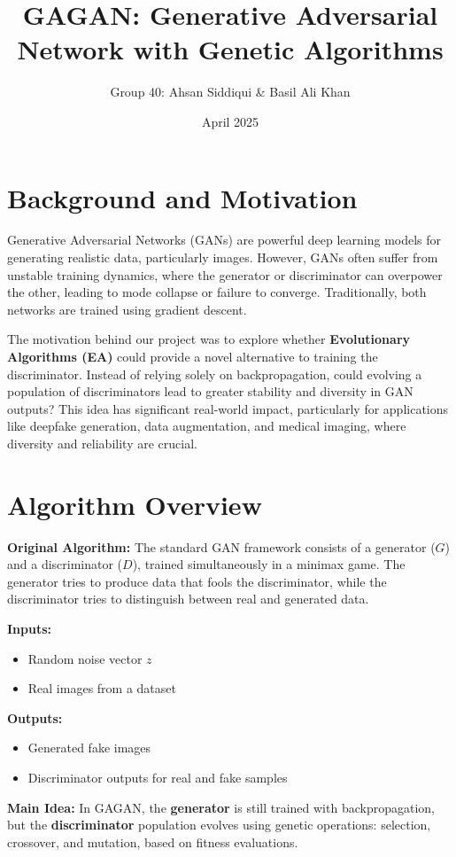\documentclass[12pt]{article}
\title{GAGAN: Generative Adversarial Network with Genetic Algorithms}
\author{Group 40: Ahsan Siddiqui \& Basil Ali Khan}
\date{April 2025}
\begin{document}
\maketitle

\tableofcontents
\newpage

\section{Background and Motivation}
Generative Adversarial Networks (GANs) are powerful deep learning models for generating realistic data, particularly images. However, GANs often suffer from unstable training dynamics, where the generator or discriminator can overpower the other, leading to mode collapse or failure to converge. Traditionally, both networks are trained using gradient descent.

The motivation behind our project was to explore whether \textbf{Evolutionary Algorithms (EA)} could provide a novel alternative to training the discriminator. Instead of relying solely on backpropagation, could evolving a population of discriminators lead to greater stability and diversity in GAN outputs? This idea has significant real-world impact, particularly for applications like deepfake generation, data augmentation, and medical imaging, where diversity and reliability are crucial.

\section{Algorithm Overview}
\textbf{Original Algorithm:} The standard GAN framework consists of a generator ($G$) and a discriminator ($D$), trained simultaneously in a minimax game. The generator tries to produce data that fools the discriminator, while the discriminator tries to distinguish between real and generated data.

\textbf{Inputs:}
\begin{itemize}
    \item Random noise vector $z$
    \item Real images from a dataset
\end{itemize}

\textbf{Outputs:}
\begin{itemize}
    \item Generated fake images
    \item Discriminator outputs for real and fake samples
\end{itemize}

\textbf{Main Idea:} In GAGAN, the \textbf{generator} is still trained with backpropagation, but the \textbf{discriminator} population evolves using genetic operations: selection, crossover, and mutation, based on fitness evaluations.
\end{document}
